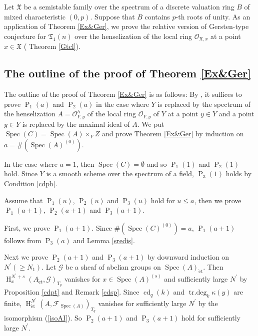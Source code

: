 \documentclass{article}
\newcommand{\spec}{\operatorname{Spec}}
\newcommand{\et}{\mathrm{\acute{e}t}}
\newcommand{\HO}{\operatorname{H}}
\begin{document}
Let $\mathfrak{X}$ be a semistable family
over the spectrum of a discrete valuation ring $B$ of mixed characteristic $(0, p)$.
Suppose that $B$ contains $p$-th roots of unity.
As an application of Theorem \ref{Ex&Ger}, 
we prove the relative version of
Gersten-type conjecture for $\mathfrak{T}_{1}(n)$ over the henselization of
the local ring $\mathcal{O}_{\mathfrak{X}, x}$ 
at a point $x\in \mathfrak{X}$ ( Theorem \ref{Gtcl}).

%
\subsection{The outline of the proof of Theorem \ref{Ex&Ger}}\label{OutMai}

The outline of the proof of Theorem \ref{Ex&Ger}
is as follows:
By \cite[p.93, III, Corollary 1.28]{M},
it suffices to prove
$\operatorname{P}_{1}(a)$ and
$\operatorname{P}_{2}(a)$
in the case where
$Y$ is replaced by the spectrum of 
the henselization
$A=\mathcal{O}^{h}_{Y, y}$
of the local ring 
$\mathcal{O}_{Y, y}$
of $Y$ at a point $y\in Y$
and a point $y\in Y$ is replaced by the maximal ideal of $A$.
We put 
$\spec(C)=\spec(A)\times_{Y}Z$
and prove Theorem \ref{Ex&Ger} by induction on $a=\#(\spec(A)^{(0)})$.

In the case where $a=1$,
then $\spec(C)=\emptyset$ and so $\operatorname{P}_{1}(1)$
and $\operatorname{P}_{2}(1)$ hold. Since $Y$
is a smooth scheme over the spectrum of a field,
$\operatorname{P}_{3}(1)$ holds by Condition \ref{cdpb}.

Assume that $\operatorname{P}_{1}(u)$, $\operatorname{P}_{2}(u)$ and
$\operatorname{P}_{3}(u)$ hold for $u\leq a$, 
then we prove 
$\operatorname{P}_{1}(a+1)$, $\operatorname{P}_{2}(a+1)$
and $\operatorname{P}_{3}(a+1)$.

First, we prove $\operatorname{P}_{1}(a+1)$. Since $\#(\spec(C)^{(0)})=a$, $\operatorname{P}_{1}(a+1)$ follows from
$\operatorname{P}_{3}(a)$
and Lemma \ref{sredis}.

Next we prove $\operatorname{P}_{2}(a+1)$
and $\operatorname{P}_{3}(a+1)$ by downward induction on $N^{\prime}(\geq N_{1})$.
Let $\mathcal{G}$ be a sheaf of abelian groups on $\spec(A)_{\et}$. Then
$\HO^{N^{\prime}+s}_{x}(A_{\et}, \mathcal{G})_{T_{q}}$
vanishes for $x\in \spec(A)^{(s)}$ and sufficiently large $N^{\prime}$
by Proposition \ref{cdpt} and Remark \ref{cdsp}. 
Since $\operatorname{cd}_{q}(k)$ and $\operatorname{tr.deg}_{k}\kappa(y)$
are finite,
$\HO^{N^{\prime}}_{\et}(A, \mathcal{F}_{\spec(A)})_{T_{q}}$
vanishes for sufficiently large $N^{\prime}$ by the isomorphism (\ref{isoAI}). 
So $\operatorname{P}_{2}(a+1)$ and $\operatorname{P}_{3}(a+1)$ hold for
sufficiently large $N^{\prime}$.
\end{document}
